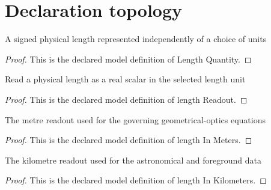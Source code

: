 \section{Declaration topology}
\begin{definition}
  \label{def:physics:phyx-mini-0153:phyxminiproblems-problemphyxmini0153-lengthquantity}
  A signed physical length represented independently of a choice of units
\end{definition}
\begin{proof}
  This is the declared model definition of Length Quantity.
\end{proof}
\begin{definition}
  \label{def:physics:phyx-mini-0153:phyxminiproblems-problemphyxmini0153-lengthreadout}
  Read a physical length as a real scalar in the selected length unit
\end{definition}
\begin{proof}
  This is the declared model definition of length Readout.
\end{proof}
\begin{definition}
  \label{def:physics:phyx-mini-0153:phyxminiproblems-problemphyxmini0153-lengthinmeters}
  The metre readout used for the governing geometrical-optics equations
\end{definition}
\begin{proof}
  This is the declared model definition of length In Meters.
\end{proof}
\begin{definition}
  \label{def:physics:phyx-mini-0153:phyxminiproblems-problemphyxmini0153-lengthinkilometers}
  The kilometre readout used for the astronomical and foreground data
\end{definition}
\begin{proof}
  This is the declared model definition of length In Kilometers.
\end{proof}
